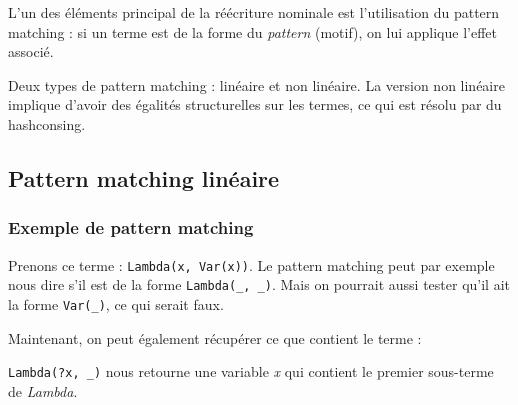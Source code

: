 
\begin{frame}

L'un des éléments principal de la réécriture nominale est l'utilisation du
pattern matching : si un terme est de la forme du \emph{pattern} (motif), on lui
applique l'effet associé. 

\bigskip

Deux types de pattern matching : linéaire et non linéaire. La version
non linéaire implique d'avoir des égalités structurelles sur les termes, ce qui
est résolu par du hashconsing. 

\end{frame}

\subsection{Pattern matching linéaire}


\begin{frame}
\frametitle{Exemple de pattern matching}

Prenons ce terme :
\texttt{Lambda(x, Var(x))}. Le pattern matching peut par exemple nous dire s'il est de la forme 
\texttt{Lambda(\_, \_)}. Mais on pourrait aussi tester qu'il ait la forme
\texttt{Var(\_)}, ce qui serait faux.

\medskip

Maintenant, on peut également récupérer ce que contient le terme :

\texttt{Lambda(?x, \_)} nous retourne une variable \emph{x} qui contient le
premier sous-terme de \emph{Lambda}.

\end{frame}

